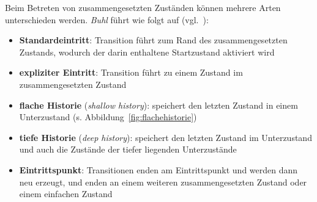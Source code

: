 \noindent
Beim Betreten von zusammengesetzten Zuständen können mehrere Arten unterschieden werden. \textit{Buhl} führt wie folgt auf (vgl.~\cite[73]{Buh09}):

\begin{itemize}
    \item \textbf{Standardeintritt}: Transition führt zum Rand des zusammengesetzten Zustands, wodurch der darin enthaltene Startzustand aktiviert wird
    \item \textbf{expliziter Eintritt}: Transition führt zu einem Zustand im zusammengesetzten Zustand
    \item \textbf{flache Historie} (\textit{shallow history}): speichert den letzten Zustand in einem Unterzustand (s. Abbildung~\ref{fig:flachehistorie})
    \item \textbf{tiefe Historie} (\textit{deep history}): speichert den letzten Zustand im Unterzustand und auch die Zustände der tiefer liegenden Unterzustände
    \item \textbf{Eintrittspunkt}: Transitionen enden am Eintrittspunkt und werden dann neu erzeugt, und enden an einem weiteren zusammengesetzten Zustand oder einem einfachen Zustand
\end{itemize}

